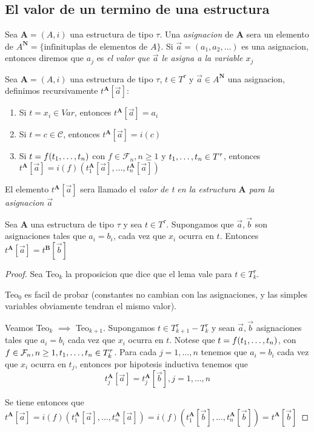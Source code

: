 \subsection{El valor de un termino de una estructura}
\begin{definition}
  Sea $\mathbf{A} = (A, i)$ una estructura de tipo $\tau$. Una \emph{asignacion} de $\mathbf{A}$ sera un elemento
  de $A^\mathbf{N} = \{\text{infinituplas de elementos de } A\}$. Si $\vec{a} = (a_1, a_2, \dots)$ es una asignacion,
  entonces diremos que $a_j$ es \emph{el valor que $\vec{a}$ le asigna a la variable $x_j$}
\end{definition}

\begin{definition}
  Sea $\mathbf{A} = (A, i)$ una estructura de tipo $\tau$, $t \in T^\tau$ y $\vec{a} \in A^\mathbf{N}$ una asignacion,
  definimos recursivamente $t^\mathbf{A}[\vec{a}]$: 
  \begin{enumerate}
    \item Si $t = x_i \in Var$, entonces $t^\mathbf{A}[\vec{a}] = a_i$
    \item Si $t = c \in \mathcal{C}$, entonces $t^\mathbf{A}[\vec{a}] = i(c)$
    \item Si $t = f(t_{1}, \dots, t_{n})$ con $f \in \mathcal{F}_n, n \geq 1$ y $t_{1}, \dots, t_{n} \in T^\tau$, entonces 
      $t^\mathbf{A}[\vec{a}] = i(f)(t_1^\mathbf{A}[\vec{a}], \dots, t_n^\mathbf{A}[\vec{a}])$
  \end{enumerate}

  El elemento $t^\mathbf{A}[\vec{a}]$ sera llamado el \emph{valor de t en la estructura $\mathbf{A}$ para la asignacion $\vec{a}$} 
\end{definition}

\begin{lemma}
  Sea $\mathbf{A}$ una estructura de tipo $\tau$ y sea $t \in T^\tau$. Supongamos que $\vec{a}, \vec{b}$ son asignaciones
  tales que $a_i = b_i$, cada vez que $x_i$ ocurra en $t$. Entonces $t^\mathbf{A}[\vec{a}] = t^\mathbf{B}[\vec{b}]$
\end{lemma}
\begin{proof}
  Sea Teo$_k$ la proposicion que dice que el lema vale para $t\in T_k^\tau$.

  Teo$_0$ es facil de probar (constantes no cambian con las asignaciones, y las simples variables obviamente tendran el mismo valor).
  
  Veamos Teo$_k$ $\implies$ Teo$_{k+1}$. Supongamos $t\in T^\tau_{k+1} - T^\tau_k$ y sean $\vec{a}, \vec{b}$ asignaciones 
  tales que $a_i = b_i$ cada vez que $x_i$ ocurra en $t$. Notese que $t = f(t_{1}, \dots, t_{n})$, con $f\in\mathcal{F}_n, n\geq 1, t_{1}, \dots, t_{n}\in T^\tau_k$.
  Para cada $j = 1,\dots,n$ tenemos que $a_i=b_i$ cada vez que $x_i$ ocurra en $t_j$, entonces por hipotesis inductiva tenemos que 
  $$
  t_j^\mathbf{A}[\vec{a}] = t_j^\mathbf{A}[\vec{b}], j = 1,\dots,n
  $$ 

  Se tiene entonces que
  $t^\mathbf{A}[\vec{a}] = i(f)(t_1^\mathbf{A}[\vec{a}], \dots, t_n^\mathbf{A}[\vec{a}]) = i(f)(t_1^\mathbf{A}[\vec{b}], \dots, t_n^\mathbf{A}[\vec{b}]) = t^\mathbf{A}[\vec{b}]$
\end{proof}

